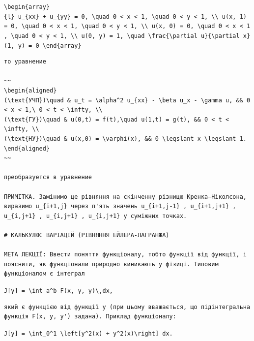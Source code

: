 \documentclass[
  ukrainian,
]{article}
\begin{document}
\texttt{\textbackslash{}begin\{array\}\{l\}\ u\_\{xx\}\ +\ u\_\{yy\}\ =\ 0,\ \textbackslash{}quad\ 0\ \textless{}\ x\ \textless{}\ 1,\ \textbackslash{}quad\ 0\ \textless{}\ y\ \textless{}\ 1,\ \textbackslash{}\textbackslash{}\ u(x,\ 1)\ =\ 0,\ \textbackslash{}quad\ 0\ \textless{}\ x\ \textless{}\ 1,\ \textbackslash{}quad\ 0\ \textless{}\ y\ \textless{}\ 1,\ \textbackslash{}\textbackslash{}\ u(x,\ 0)\ =\ 0,\ \textbackslash{}quad\ 0\ \textless{}\ x\ \textless{}\ 1,\ \textbackslash{}quad\ 0\ \textless{}\ y\ \textless{}\ 1,\ \textbackslash{}\textbackslash{}\ u(0,\ y)\ =\ 1,\ \textbackslash{}quad\ \textbackslash{}frac\{\textbackslash{}partial\ u\}\{\textbackslash{}partial\ x\}(1,\ y)\ =\ 0\ \textbackslash{}end\{array\}}

\begin{verbatim}
то уравнение

~~
\begin{aligned}
(\text{УЧП})\quad & u_t = \alpha^2 u_{xx} - \beta u_x - \gamma u, && 0 < x < 1,\ 0 < t < \infty, \\
(\text{ГУ})\quad & u(0,t) = f(t),\quad u(1,t) = g(t), && 0 < t < \infty, \\
(\text{НУ})\quad & u(x,0) = \varphi(x), && 0 \leqslant x \leqslant 1.
\end{aligned}
~~

преобразуется в уравнение

ПРИМІТКА. Замінимо це рівняння на скінченну різницю Кренка–Ніколсона, виразимо u_{i+1,j} через п'ять значень u_{i+1,j-1} , u_{i+1,j+1} , u_{i,j+1} , u_{i,j+1} , u_{i,j+1} у суміжних точках.

# КАЛЬКУЛЮС ВАРІАЦІЙ (РІВНЯННЯ ЕЙЛЕРА-ЛАГРАНЖА)

МЕТА ЛЕКЦІЇ: Ввести поняття функціоналу, тобто функції від функції, і пояснити, як функціонали природно виникають у фізиці. Типовим функціоналом є інтеграл
\end{verbatim}

\texttt{J{[}y{]}\ =\ \textbackslash{}int\_a\^{}b\ F(x,\ y,\ y\textquotesingle{})\textbackslash{},dx,}

\begin{verbatim}
який є функцією від функції y (при цьому вважається, що підінтегральна функція F(x, y, y') задана). Приклад функціоналу:
\end{verbatim}

\texttt{J{[}y{]}\ =\ \textbackslash{}int\_0\^{}1\ \textbackslash{}left{[}y\^{}2(x)\ +\ y\textquotesingle{}\^{}2(x)\textbackslash{}right{]}\ dx.}
\end{document}
